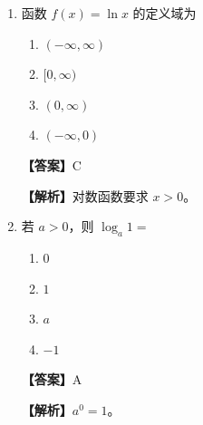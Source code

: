 \documentclass[UTF8,a4paper]{ctexart}
\begin{document}
\begin{enumerate}[leftmargin=2em,itemsep=0.8em]
\begin{enumerate}[label=\Alph*.,itemsep=0.2em,parsep=0pt]

\item $\frac14$

\item $\frac12$

\item $\frac34$

\item $\frac18$

\end{enumerate}


\par\noindent\textbf{【答案】}A
\par\noindent\textbf{【解析】}$P(X=0)=(1/2)^2=1/4$。



\item 函数 $f(x)=\ln x$ 的定义域为

\begin{enumerate}[label=\Alph*.,itemsep=0.2em,parsep=0pt]

\item $(-\infty,\infty)$

\item $[0,\infty)$

\item $(0,\infty)$

\item $(-\infty,0)$

\end{enumerate}


\par\noindent\textbf{【答案】}C
\par\noindent\textbf{【解析】}对数函数要求 $x>0$。



\item 若 $a>0$，则 $\log_a 1=$

\begin{enumerate}[label=\Alph*.,itemsep=0.2em,parsep=0pt]

\item $0$

\item $1$

\item $a$

\item $-1$

\end{enumerate}


\par\noindent\textbf{【答案】}A
\par\noindent\textbf{【解析】}$a^0=1$。




\end{enumerate}
\end{document}

